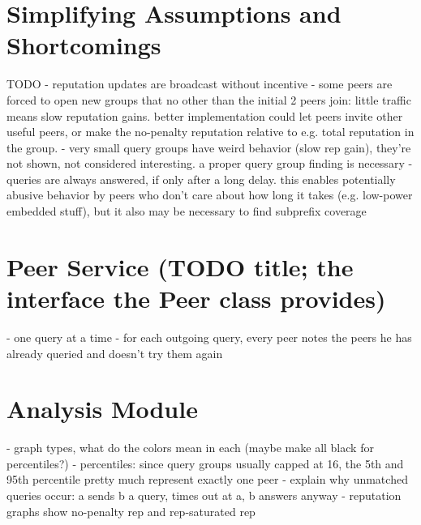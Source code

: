 \section{Simplifying Assumptions and Shortcomings}
TODO
- reputation updates are broadcast without incentive
- some peers are forced to open new groups that no other than the initial 2
  peers join: little traffic means slow reputation gains.
  better implementation could let peers invite other useful peers, or make the
  no-penalty reputation relative to e.g. total reputation in the group.
- very small query groups have weird behavior (slow rep gain), they're not
  shown, not considered interesting. a proper query group finding is necessary
- queries are always answered, if only after a long delay. this enables
  potentially abusive behavior by peers who don't care about how long it takes
  (e.g. low-power embedded stuff), but it also may be necessary to find
  subprefix coverage

\section{Peer Service (TODO title; the interface the Peer class provides)}
- one query at a time
- for each outgoing query, every peer notes the peers he has already queried and
  doesn't try them again
\section{Analysis Module}
- graph types, what do the colors mean in each (maybe make all black for
  percentiles?)
- percentiles: since query groups usually capped at 16, the 5th and 95th
  percentile pretty much represent exactly one peer
- explain why unmatched queries occur: a sends b a query, times out at a, b
  answers anyway
- reputation graphs show no-penalty rep and rep-saturated rep
